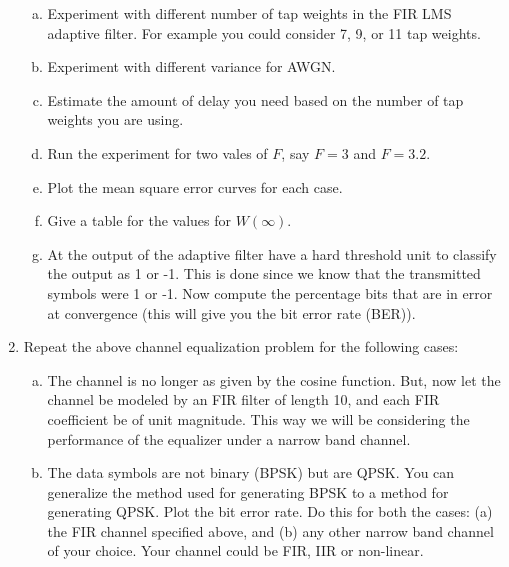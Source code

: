 \documentclass[journal,12pt,onecolumn]{IEEEtran}
\begin{document}
\begin{enumerate}
\medskip
\begin{enumerate}[(a)]
\item Experiment with different number of tap weights in the FIR LMS adaptive filter. For example you could consider 7, 9, or 11 tap weights.
\item Experiment with different variance for AWGN.
\item Estimate the amount of delay you need based on the number of tap weights you are using.
\item Run the experiment for two vales of $F$, say $F=3$ and $F=3.2$.
\item Plot the mean square error curves for each case.
\item Give a table for the values for $W(\infty).$
\item At the output of the adaptive filter have a hard threshold unit to classify the output as 1 or -1. This is done since we know that the transmitted symbols were 1 or -1. Now compute the percentage bits that are in error at convergence (this will give you the bit error rate (BER)).
\end{enumerate}
\medskip
\item Repeat the above channel equalization problem for the following cases:
\medskip
\begin{enumerate}[(a)]
\item The channel is no longer as given by the cosine function. But, now let the channel be modeled by an FIR filter of length 10, and each FIR coefficient be of unit magnitude. This way we will be considering the performance of the equalizer under a narrow band channel.
\item The data symbols are not binary (BPSK) but are QPSK. You can generalize the method used for generating BPSK to a method for generating QPSK. Plot the bit error rate. Do this for both the cases: (a) the FIR channel specified above, and (b) any other narrow band channel of your choice. Your channel could be FIR, IIR or non-linear.
\end{enumerate}






















\end{enumerate}
\end{document}
